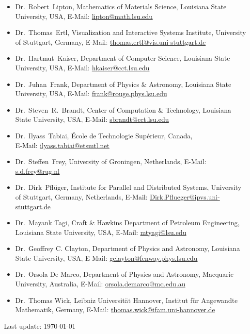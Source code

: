 \documentclass[11pt,a4paper,sans]{moderncv}
\begin{document}
\begin{itemize}[leftmargin=4cm]
\item Dr.~Robert~Lipton, Mathematics of Materials Science, Louisiana State University, USA, E-Mail: \url{lipton@math.lsu.edu}
\item Dr.~Thomas~Ertl, Visualization and Interactive Systems Institute, University of Stuttgart, Germany, E-Mail: \url{thomas.ertl@vis.uni-stuttgart.de}
\item Dr.~Hartmut~Kaiser, Department of Computer Science, Louisiana State University, USA, E-Mail: \url{hkaiser@cct.lsu.edu}
\item Dr.~Juhan~Frank, Department of Physics \& Astronomy, Louisiana State University, USA, E-Mail: \url{frank@rouge.phys.lsu.edu}
\item Dr.~Steven~R.~Brandt, Center of Computation \& Technology, Louisiana State University, USA, E-Mail: \url{sbrandt@cct.lsu.edu}
\item Dr.~Ilyass~Tabiai, École de Technologie Supérieur, Canada, \\E-Mail: \url{ilyass.tabiai@etsmtl.net}
\item Dr.~Steffen~Frey, University of Groningen, Netherlands, E-Mail: \url{s.d.frey@rug.nl}
\item Dr.~Dirk~Pfl\"uger, Institute for Parallel and Distributed Systems, University of Stuttgart, Germany, Netherlands, E-Mail: \url{Dirk.Pflueger@ipvs.uni-stuttgart.de}
\item Dr.~Mayank Tagi, Craft \& Hawkins Department of Petroleum Engineering, Louisiana State University, USA, E-Mail:  \url{mtyagi@lsu.edu}
\item Dr.~Geoffrey C. Clayton, Department of Physics and Astronomy, Louisiana State University, USA, E-Mail: \url{gclayton@fenway.phys.lsu.edu}
\item Dr.~Orsola De Marco, Department of Physics and Astronomy, Macquarie University, Australia, E-Mail: \url{orsola.demarco@mq.edu.au}
\item Dr.~Thomas Wick, Leibniz Universit{\"a}t Hannover, Institut f{\"u}r Angewandte Mathematik, Germany, E-Mail: \url{thomas.wick@ifam.uni-hannover.de}
\end{itemize}
\begin{center}
Last update: \today
\end{center}
\end{document}
